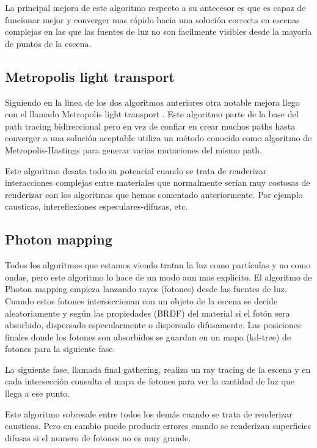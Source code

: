 \medskip
La principal mejora de este algoritmo respecto a su antecesor es que es capaz de funcionar mejor y converger mas rápido hacia una solución correcta en escenas complejas en las que las fuentes de luz no son facilmente visibles desde la mayoría de puntos de la escena.

\subsection{Metropolis light transport}

Siguiendo en la linea de los dos algoritmos anteriores otra notable mejora llego con el llamado Metropolis light transport \cite{Veach1997}. Este algoritmo parte de la base del path tracing bidireccional pero en vez de confiar en crear muchos paths hasta converger a una solución aceptable utiliza un método conocido como algoritmo de Metropolis-Hastings para generar varias mutaciones del mismo path. 

\medskip
Este algoritmo desata todo su potencial cuando se trata de renderizar interacciones complejas entre materiales que normalmente serian muy costosas de renderizar con los algoritmos que hemos comentado anteriormente. Por ejemplo causticas, intereflexiones especulares-difusas, etc.

\clearpage

\subsection{Photon mapping}

Todos los algoritmos que estamos viendo tratan la luz como partículas y no como ondas, pero este algoritmo lo hace de un modo aun mas explicito.
El algoritmo de Photon mapping \cite{Jensen1996} empieza lanzando rayos (fotones) desde las fuentes de luz. Cuando estos fotones interseccionan con un objeto de la escena se decide aleatoriamente y según las propiedades (BRDF) del material si el fotón sera absorbido, dispersado especularmente o dispersado difusamente. Las posiciones finales donde los fotones son absorbidos se guardan en un mapa (kd-tree) de fotones para la siguiente fase.

\medskip
La siguiente fase, llamada final gathering, realiza un ray tracing de la escena y en cada intersección consulta el mapa de fotones para ver la cantidad de luz que llega a ese punto.

\medskip
Este algoritmo sobresale entre todos los demás cuando se trata de renderizar causticas. Pero en cambio puede producir errores cuando se renderizan superficies difusas si el numero de fotones no es muy grande.



